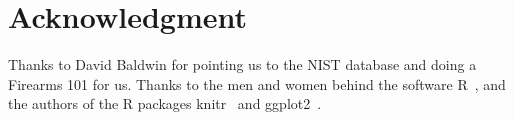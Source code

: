 \documentclass[aoas, preprint]{imsart}\usepackage[]{graphicx}\usepackage[]{color}
\newcommand{\hh}[1]{{\color{magenta} #1}}
\begin{document}


\section*{Acknowledgment} 
Thanks to David Baldwin for pointing us to the NIST database and doing a Firearms 101 for us.
Thanks to the men and women behind the software R~\citep{R}, and the authors of the R packages  knitr~\citep{knitr} and ggplot2~\citep{ggplot2}.






\end{document}
